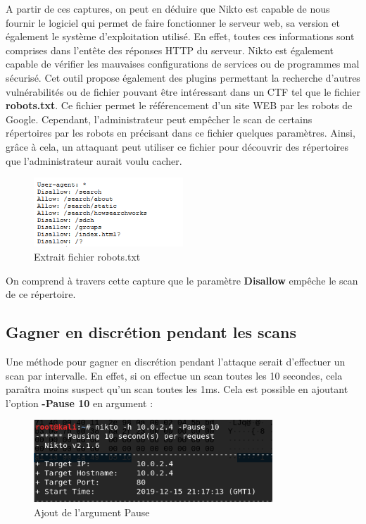 A partir de ces captures, on peut en déduire que Nikto est capable de nous fournir le logiciel qui permet de faire fonctionner le serveur web, sa version et également le système d'exploitation utilisé. En effet, toutes ces informations sont comprises dans l'entête des réponses HTTP du serveur. Nikto est également capable de vérifier les mauvaises configurations de services ou de programmes mal sécurisé. Cet outil propose également des plugins permettant la recherche d'autres vulnérabilités ou de fichier pouvant être intéressant dans un CTF tel que le fichier \textbf{robots.txt}. Ce fichier permet le référencement d'un site WEB par les robots de Google. Cependant, l'administrateur peut empêcher le scan de certains répertoires par les robots en précisant dans ce fichier quelques paramètres. Ainsi, grâce à cela, un attaquant peut utiliser ce fichier pour découvrir des répertoires que l'administrateur aurait voulu cacher.

\begin{figure}[htp!]
  \centering
  \setlength\figureheight{7cm}
  \setlength\figurewidth{9cm}
  \includegraphics[width=0.5\textwidth]{oui/Ancien/imangeancien/Nikto/robots.PNG}
  \caption{Extrait fichier robots.txt}
  \label{fig:courbe-tikz}
\end{figure}

\noindent On comprend à travers cette capture que le paramètre \textbf{Disallow} empêche le scan de ce répertoire.\\

\subsection{Gagner en discrétion pendant les scans}
Une méthode pour gagner en discrétion pendant l'attaque serait d'effectuer un scan par intervalle. En effet, si on effectue un scan toutes les 10 secondes, cela paraîtra moins suspect qu'un scan toutes les 1ms. Cela est possible en ajoutant l'option \textbf{-Pause 10} en argument :

\begin{figure}[htp!]
  \centering
  \setlength\figureheight{7cm}
  \setlength\figurewidth{9cm}
  \includegraphics[width=0.8\textwidth]{oui/Ancien/imangeancien/Nikto/nikto9.png}
  \caption{Ajout de l'argument Pause}
  \label{fig:courbe-tikz}
\end{figure}

